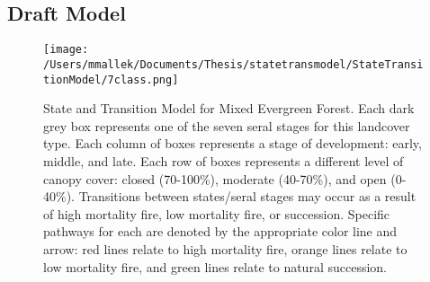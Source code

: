 \subsection*{Draft Model}
\begin{figure}[htbp]
\centering
\texttt{[image: /Users/mmallek/Documents/Thesis/statetransmodel/StateTransitionModel/7class.png]}
\caption{State and Transition Model for Mixed Evergreen Forest. Each dark grey box represents one of the seven seral stages for this landcover type. Each column of boxes represents a stage of development: early, middle, and late. Each row of boxes represents a different level of canopy cover: closed (70-100\%), moderate (40-70\%), and open (0-40\%). Transitions between states/seral stages may occur as a result of high mortality fire, low mortality fire, or succession. Specific pathways for each are denoted by the appropriate color line and arrow: red lines relate to high mortality fire, orange lines relate to low mortality fire, and green lines relate to natural succession.} 
\label{meg_transmodel}
\end{figure}

\clearpage

